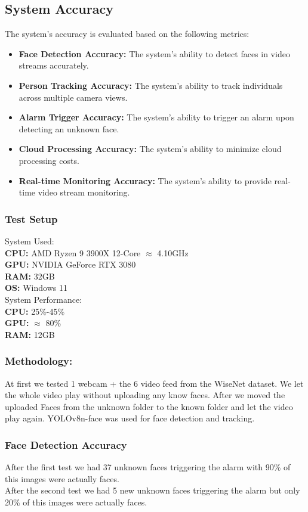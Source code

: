 \documentclass[conference]{IEEEtran}
\begin{document}
\subsection{System Accuracy}
The system's accuracy is evaluated based on the following metrics:
\begin{itemize}
      \item \textbf{Face Detection Accuracy:} The system's ability to detect faces in video streams accurately.
      \item \textbf{Person Tracking Accuracy:} The system's ability to track individuals across multiple camera views.
      \item \textbf{Alarm Trigger Accuracy:} The system's ability to trigger an alarm upon detecting an unknown face.
      \item \textbf{Cloud Processing Accuracy:} The system's ability to minimize cloud processing costs.
      \item \textbf{Real-time Monitoring Accuracy:} The system's ability to provide real-time video stream monitoring.
\end{itemize}

\subsubsection{Test Setup}

System Used:\\
\textbf{CPU:} AMD Ryzen 9 3900X 12-Core $\approx$ 4.10GHz\\
\textbf{GPU:} NVIDIA GeForce RTX 3080\\
\textbf{RAM:} 32GB\\
\textbf{OS:} Windows 11\\
System Performance:\\
\textbf{CPU:} 25\%-45\%\\
\textbf{GPU:} $\approx$ 80\%\\
\textbf{RAM:} 12GB
\subsubsection{Methodology:}
At first we tested 1 webcam + the 6 video feed from the WiseNet dataset. We let the whole video play without uploading any know faces.
After we moved the uploaded Faces from the unknown folder to the known folder and let the video play again.
YOLOv8n-face was used for face detection and tracking.
\subsubsection{Face Detection Accuracy}
After the first test we had 37 unknown faces triggering the alarm with 90\% of this images were actually faces.\\
After the second test we had 5 new unknown faces triggering the alarm but only 20\% of this images were actually faces.\\
\end{document}
